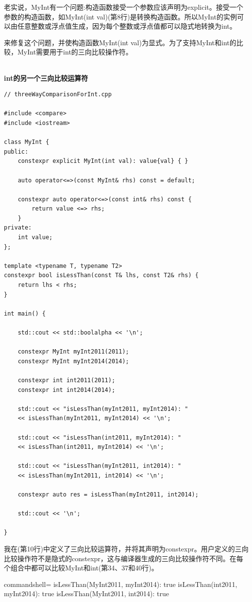 老实说，MyInt有一个问题:构造函数接受一个参数应该声明为explicit。接受一个参数的构造函数，如MyInt(int val)(第8行)是转换构造函数。所以MyInt的实例可以由任意整数或浮点值生成，因为每个整数或浮点值都可以隐式地转换为int。

来修复这个问题，并使构造函数MyInt(int val)为显式。为了支持MyInt和int的比较，MyInt需要用于int的三向比较操作符。

\hspace*{\fill} \\ %
\noindent
\textbf{int的另一个三向比较运算符}
\begin{lstlisting}[style=styleCXX]
// threeWayComparisonForInt.cpp

#include <compare>
#include <iostream>

class MyInt {
public:
	constexpr explicit MyInt(int val): value{val} { }
	
	auto operator<=>(const MyInt& rhs) const = default;
	
	constexpr auto operator<=>(const int& rhs) const {
		return value <=> rhs;
	}
private:
	int value;
};

template <typename T, typename T2>
constexpr bool isLessThan(const T& lhs, const T2& rhs) {
	return lhs < rhs;
}

int main() {

	std::cout << std::boolalpha << '\n';
	
	constexpr MyInt myInt2011(2011);
	constexpr MyInt myInt2014(2014);
	
	constexpr int int2011(2011);
	constexpr int int2014(2014);
	
	std::cout << "isLessThan(myInt2011, myInt2014): "
	<< isLessThan(myInt2011, myInt2014) << '\n';
	
	std::cout << "isLessThan(int2011, myInt2014): "
	<< isLessThan(int2011, myInt2014) << '\n';
	
	std::cout << "isLessThan(myInt2011, int2014): "
	<< isLessThan(myInt2011, int2014) << '\n';
	
	constexpr auto res = isLessThan(myInt2011, int2014);
	
	std::cout << '\n';

}
\end{lstlisting}

我在(第10行)中定义了三向比较运算符，并将其声明为constexpr。用户定义的三向比较操作符不是隐式的constexpr，这与编译器生成的三向比较操作符不同。在每个组合中都可以比较MyInt和int(第34、37和40行)。

\begin{tcblisting}{commandshell={}}
isLessThan(MyInt2011, myInt2014): true
isLessThan(int2011, myInt2014): true
isLessThan(MyInt2011, int2014): true
\end{tcblisting}

